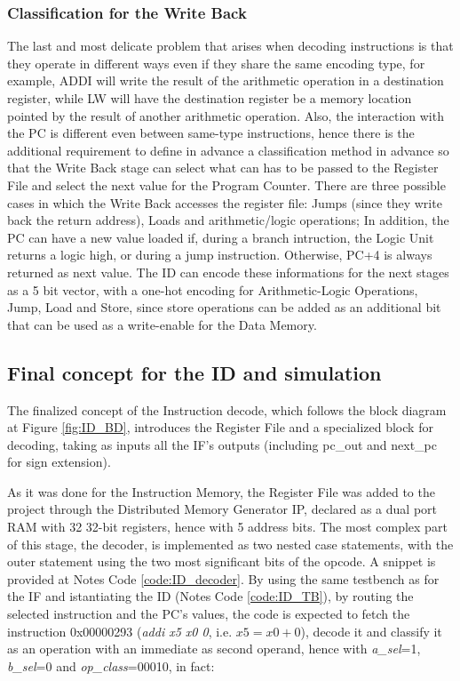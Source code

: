 \subsubsection{Classification for the Write Back}
The last and most delicate problem that arises when decoding instructions is that they operate in different ways even if they share the same encoding type, for example, ADDI will write the result of the arithmetic operation in a destination register, while LW will have the destination register be a memory location pointed by the result of another arithmetic operation. Also, the interaction with the PC is different even between same-type instructions, hence there is the additional requirement to define in advance a classification method in advance so that the Write Back stage can select what can has to be passed to the Register File and select the next value for the Program Counter. There are three possible cases in which the Write Back accesses the register file: Jumps (since they write back the return address), Loads and arithmetic/logic operations; In addition, the PC can have a new value loaded if, during a branch intruction, the Logic Unit returns a logic high, or during a jump instruction. Otherwise, PC+4 is always returned as next value.
The ID can encode these informations for the next stages as a 5 bit vector, with a one-hot encoding for Arithmetic-Logic Operations, Jump, Load and Store, since store operations can be added as an additional bit that can be used as a write-enable for the Data Memory.

\subsection{Final concept for the ID and simulation}
The finalized concept of the Instruction decode, which follows the block diagram at Figure \ref{fig:ID_BD}, introduces the Register File and a specialized block for decoding, taking as inputs all the IF's outputs (including {pc\_out} and {next\_pc} for sign extension).

As it was done for the Instruction Memory, the Register File was added to the project through the Distributed Memory Generator IP, declared as a dual port RAM with 32 32-bit registers, hence with 5 address bits. The most complex part of this stage, the decoder, is implemented as two nested case statements, with the outer statement using the two most significant bits of the opcode. A snippet is provided at Notes Code \ref{code:ID_decoder}.
By using the same testbench as for the IF and istantiating the ID (Notes Code \ref{code:ID_TB}), by routing the selected instruction and the PC's values, the code is expected to fetch the instruction 0x00000293 (\emph{addi x5 x0 0}, i.e. $x5 = x0 + 0$), decode it and classify it as an operation with an immediate as second operand, hence with \emph{a{\_}sel}=1, \emph{b{\_}sel}=0 and \emph{op{\_}class}=00010, in fact:

